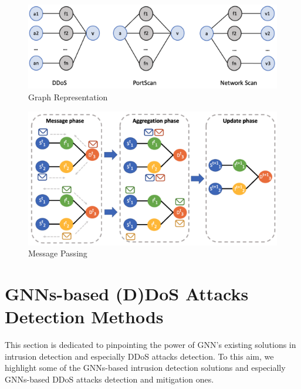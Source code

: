 \begin{figure}
\centering
    \includegraphics[scale=0.9]{figures/unveilingg.png}
    \captionsetup{font=large}
    \caption{\cite{unveiling} Graph Representation}
\label{fig:unveilingg}
\end{figure}
    
\begin{figure}
\centering
    \includegraphics[scale=0.8]{figures/unveilingmp.png}
    \captionsetup{font=large}
    \caption{\cite{unveiling}Message Passing}
\label{fig:unveilingmp}
\end{figure}





 

\section{GNNs-based (D)DoS Attacks Detection Methods}
This section is dedicated to pinpointing the power of GNN's existing solutions in intrusion detection and especially DDoS attacks detection. To this aim, we highlight some of the GNNs-based intrusion detection solutions and especially GNNs-based DDoS attacks detection and mitigation ones.
